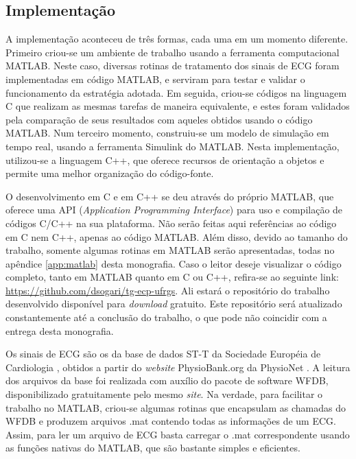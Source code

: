 \subsection*{Implementação}

A implementação aconteceu de três formas, cada uma em um momento diferente. Primeiro criou-se um ambiente de trabalho usando a ferramenta computacional MATLAB. Neste caso, diversas rotinas de tratamento dos sinais de ECG foram implementadas em código MATLAB, e serviram para testar e validar o funcionamento da estratégia adotada. Em seguida, criou-se códigos na linguagem C que realizam as mesmas tarefas de maneira equivalente, e estes foram validados pela comparação de seus resultados com aqueles obtidos usando o código MATLAB. Num terceiro momento, construiu-se um modelo de simulação em tempo real, usando a ferramenta Simulink do MATLAB. Nesta implementação, utilizou-se a linguagem C++, que oferece recursos de orientação a objetos e permite uma melhor organização do código-fonte.

O desenvolvimento em C e em C++ se deu através do próprio MATLAB, que oferece uma API (\emph{Application Programming Interface}) para uso e compilação de códigos C/C++ na sua plataforma. Não serão feitas aqui referências ao código em C nem C++, apenas ao código MATLAB. Além disso, devido ao tamanho do trabalho, somente algumas rotinas em MATLAB serão apresentadas, todas no apêndice \ref{app:matlab} desta monografia. Caso o leitor deseje visualizar o código completo, tanto em MATLAB quanto em C ou C++, refira-se ao seguinte link: \url{https://github.com/dsogari/tg-ecp-ufrgs}. Ali estará o repositório do trabalho desenvolvido disponível para \emph{download} gratuito. Este repositório será atualizado constantemente até a conclusão do trabalho, o que pode não coincidir com a entrega desta monografia.

Os sinais de ECG são os da base de dados ST-T da Sociedade Européia de Cardiologia \cite{Taddei1992}, obtidos a partir do \emph{website} PhysioBank.org da PhysioNet \cite{Goldberger2000}. A leitura dos arquivos da base foi realizada com auxílio do pacote de software WFDB, disponibilizado gratuitamente pelo mesmo \emph{site}. Na verdade, para facilitar o trabalho no MATLAB, criou-se algumas rotinas que encapsulam as chamadas do WFDB e produzem arquivos .mat contendo todas as informações de um ECG. Assim, para ler um arquivo de ECG basta carregar o .mat correspondente usando as funções nativas do MATLAB, que são bastante simples e eficientes.

